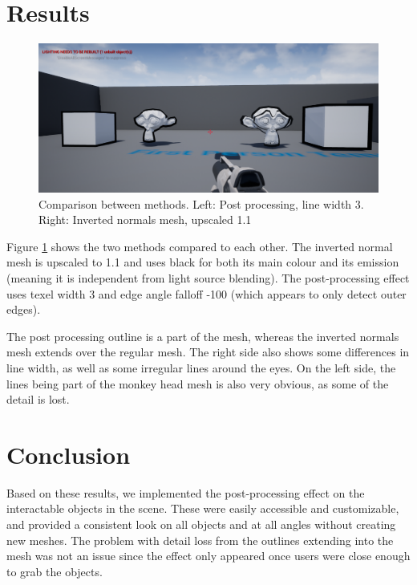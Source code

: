 \documentclass[paper=a4, fontsize=11pt]{scrartcl} %
\numberwithin{equation}{section} %
\numberwithin{figure}{section} %
\numberwithin{table}{section} %
\begin{document}
\section{Results}

\begin{figure}[H]
\centering
\includegraphics[width=1.0\textwidth]{comparison.png}
\caption{Comparison between methods. Left: Post processing, line width 3. Right: Inverted normals mesh, upscaled 1.1}
\label{fig:comparison}
\end{figure}

Figure \ref{fig:comparison} shows the two methods compared to each other. The inverted normal mesh is upscaled to 1.1 and uses black for both its main colour and its emission (meaning it is independent from light source blending). The post-processing effect uses texel width 3 and edge angle falloff -100 (which appears to only detect outer edges).

The post processing outline is a part of the mesh, whereas the inverted normals mesh extends over the regular mesh. The right side also shows some differences in line width, as well as some irregular lines around the eyes. On the left side, the lines being part of the monkey head mesh is also very obvious, as some of the detail is lost. 

\section{Conclusion}

Based on these results, we implemented the post-processing effect on the interactable objects in the scene. These were easily accessible and customizable, and provided a consistent look on all objects and at all angles without creating new meshes. The problem with detail loss from the outlines extending into the mesh was not an issue since the effect only appeared once users were close enough to grab the objects.
\end{document}
